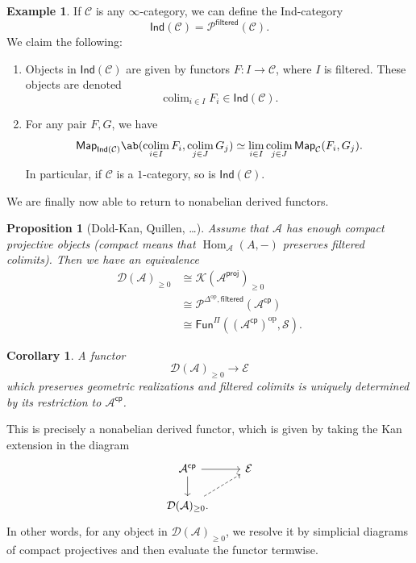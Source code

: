 \documentclass[10pt, oneside]{memoir}
\newtheorem{cor}[thm]{Corollary}
\newtheorem{prop}[thm]{Proposition}
\theoremstyle{definition}
\newtheorem{exm}[thm]{Example}
\theoremstyle{remark}
\theoremstyle{plain}
\theoremstyle{definition}
\theoremstyle{remark}
\newcommand{\mc}[1]{\mathcal{#1}}
\newcommand{\ms}[1]{\mathsf{#1}}
\newcommand{\1}{\mathbf{1}}
\newcommand{\2}{\mathbf{2}}
\newcommand{\3}{\mathbf{3}}
\DeclareMathOperator{\Hom}{Hom}
\DeclareMathOperator{\op}{op}
\DeclareMathOperator*{\colim}{colim}
\begin{document}
\begin{exm}
    If \(\mc{C} \) is any \(\infty \)-category, we can define the Ind-category
    \[ \ms{Ind}(\mc{C}) = \mc{P}^{\ms{filtered}}(\mc{C}). \]
    We claim the following:
    \begin{enumerate}
        \item Objects in \(\ms{Ind}(\mc{C}) \) are given by functors \(F \colon I \to \mc{C} \), where \(I \) is filtered. These objects are denoted
        \[ \colim_{i \in I} F_i \in \ms{Ind}(\mc{C}). \]
        \item For any pair \(F, G \), we have
        \[ \ms{Map}_{\ms{Ind}(\mc{C})} \ab(\colim_{i \in I} F_i, \colim_{j \in J} G_j) \simeq \lim_{i \in I} \colim_{j \in J} \ms{Map}_{\mc{C}}(F_i, G_j). \]
        In particular, if \(\mc{C} \) is a \(1 \)-category, so is \(\ms{Ind}(\mc{C}) \).
    \end{enumerate}
\end{exm}

We are finally now able to return to nonabelian derived functors.
\begin{prop}[Dold-Kan, Quillen, \dots]
    Assume that \(\mc{A} \) has enough compact projective objects (compact means that \(\Hom_{\mc{A}}(A,-) \) preserves filtered colimits). Then we have an equivalence
    \begin{align*}
        \mc{D}(\mc{A})_{\geq 0} &\cong \mc{K}(\mc{A}^{\ms{proj}})_{\geq 0} \\
        &\cong \mc{P}^{\Delta^{\op}, \ms{filtered}}(\mc{A}^{\ms{cp}}) \\
        &\cong \ms{Fun}^{\Pi} ((\mc{A}^{\ms{cp}})^{\op}, \mc{S}).
    \end{align*}
\end{prop}

\begin{cor}
    A functor
    \[ \mc{D}(\mc{A})_{\geq 0} \to \mc{E} \]
    which preserves geometric realizations and filtered colimits is uniquely determined by its restriction to \(\mc{A}^{\ms{cp}} \).
\end{cor}

This is precisely a nonabelian derived functor, which is given by taking the Kan extension in the diagram
\begin{equation*}
\begin{tikzcd}
    \mc{A}^{\ms{cp}} \ar{r} \ar{d} & \mc{E} \\
    \mc{D}(\mc{A})_{\geq 0} \ar[dashrightarrow]{ur}.
\end{tikzcd}
\end{equation*}
In other words, for any object in \(\mc{D}(\mc{A})_{\geq 0} \), we resolve it by simplicial diagrams of compact projectives and then evaluate the functor termwise.
\end{document}
